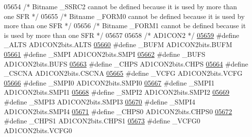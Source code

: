 \begin{DoxyCode}
05654 \textcolor{comment}{/* Bitname \_SSRC2 cannot be defined because it is used by more than one SFR */}
05655 \textcolor{comment}{/* Bitname \_FORM0 cannot be defined because it is used by more than one SFR */}
05656 \textcolor{comment}{/* Bitname \_FORM1 cannot be defined because it is used by more than one SFR */}
05657 
05658 \textcolor{comment}{/* AD1CON2 */}
\hypertarget{a00009_source_l05659}{}\hyperlink{a00009_ac12b887f90e13ade5e23e7708f4c8485}{05659} \textcolor{preprocessor}{#define \_ALTS AD1CON2bits.ALTS}
\hypertarget{a00009_source_l05660}{}\hyperlink{a00009_a16f24daad17547b055a217ecd935d85e}{05660} \textcolor{preprocessor}{#define \_BUFM AD1CON2bits.BUFM}
\hypertarget{a00009_source_l05661}{}\hyperlink{a00009_a3c1fe973f4a5f8b3c0f8903f445cbcaf}{05661} \textcolor{preprocessor}{#define \_SMPI AD1CON2bits.SMPI}
\hypertarget{a00009_source_l05662}{}\hyperlink{a00009_adcc85cb11c412a2d2a4f84a1f39a4b65}{05662} \textcolor{preprocessor}{#define \_BUFS AD1CON2bits.BUFS}
\hypertarget{a00009_source_l05663}{}\hyperlink{a00009_a8ca5a880c36e995e697bbb4a69e022b1}{05663} \textcolor{preprocessor}{#define \_CHPS AD1CON2bits.CHPS}
\hypertarget{a00009_source_l05664}{}\hyperlink{a00009_aeb2ce140daf83f21d4d65065dd66111e}{05664} \textcolor{preprocessor}{#define \_CSCNA AD1CON2bits.CSCNA}
\hypertarget{a00009_source_l05665}{}\hyperlink{a00009_aa87d90c6eacb675e3177e12b6cc3426e}{05665} \textcolor{preprocessor}{#define \_VCFG AD1CON2bits.VCFG}
\hypertarget{a00009_source_l05666}{}\hyperlink{a00009_a95ddfd96f670f1c5127663bf849758be}{05666} \textcolor{preprocessor}{#define \_SMPI0 AD1CON2bits.SMPI0}
\hypertarget{a00009_source_l05667}{}\hyperlink{a00009_aa82841bc4442cbb573d687e14e709643}{05667} \textcolor{preprocessor}{#define \_SMPI1 AD1CON2bits.SMPI1}
\hypertarget{a00009_source_l05668}{}\hyperlink{a00009_aa06074aa70b83f417946c89ec227ead6}{05668} \textcolor{preprocessor}{#define \_SMPI2 AD1CON2bits.SMPI2}
\hypertarget{a00009_source_l05669}{}\hyperlink{a00009_adad7552eec3f268609297e5c0f24054e}{05669} \textcolor{preprocessor}{#define \_SMPI3 AD1CON2bits.SMPI3}
\hypertarget{a00009_source_l05670}{}\hyperlink{a00009_a68b7a030bfd08ac6d8a140c95909b628}{05670} \textcolor{preprocessor}{#define \_SMPI4 AD1CON2bits.SMPI4}
\hypertarget{a00009_source_l05671}{}\hyperlink{a00009_a296025f936afedac26a69ae7cf61857c}{05671} \textcolor{preprocessor}{#define \_CHPS0 AD1CON2bits.CHPS0}
\hypertarget{a00009_source_l05672}{}\hyperlink{a00009_ad4d1ccbe8c057a37a319f2d8dec6268c}{05672} \textcolor{preprocessor}{#define \_CHPS1 AD1CON2bits.CHPS1}
\hypertarget{a00009_source_l05673}{}\hyperlink{a00009_a8ff5759693655f86db18d63ed05a821a}{05673} \textcolor{preprocessor}{#define \_VCFG0 AD1CON2bits.VCFG0}

\end{DoxyCode}
